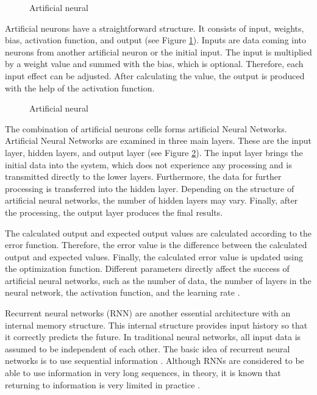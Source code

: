 \begin{figure}[htbp]
\centering
{}
\caption{Artificial neural \cite{veronez2011regional}}
\label{fig:MethodologyArtificialNeural}
\end{figure}

Artificial neurons have a straightforward structure. It consists of input, weights, bias, activation function, and output (see Figure \ref{fig:MethodologyArtificialNeural}). Inputs are data coming into neurons from another artificial neuron or the initial input. The input is multiplied by a weight value and summed with the bias, which is optional. Therefore, each input effect can be adjusted. After calculating the value, the output is produced with the help of the activation function. 

\begin{figure}[htbp]
\centering
{}
\caption{Artificial neural \cite{bre2018prediction}}
\label{fig:MethodologyArtificialNeuralNetwork}
\end{figure}

The combination of artificial neurons cells forms artificial Neural Networks. Artificial Neural Networks are examined in three main layers. These are the input layer, hidden layers, and output layer (see Figure \ref{fig:MethodologyArtificialNeuralNetwork}). The input layer brings the initial data into the system, which does not experience any processing and is transmitted directly to the lower layers. Furthermore, the data for further processing is transferred into the hidden layer. Depending on the structure of artificial neural networks, the number of hidden layers may vary. Finally, after the processing, the output layer produces the final results. 

The calculated output and expected output values are calculated according to the error function. Therefore, the error value is the difference between the calculated output and expected values. Finally, the calculated error value is updated using the optimization function. Different parameters directly affect the success of artificial neural networks, such as the number of data, the number of layers in the neural network, the activation function, and the learning rate \cite{goodfellow2016deep}.

Recurrent neural networks (RNN) are another essential architecture with an internal memory structure. This internal structure provides input history so that it correctly predicts the future. In traditional neural networks, all input data is assumed to be independent of each other. The basic idea of recurrent neural networks is to use sequential information \cite{medsker1999recurrent}. Although RNNs are considered to be able to use information in very long sequences, in theory, it is known that returning to information is very limited in practice \cite{medsker1999recurrent}.

